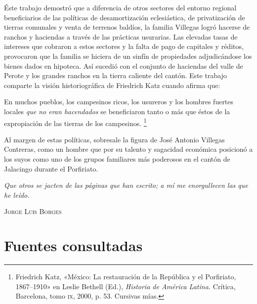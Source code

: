 \documentclass[14pt,twoside,final]{extbook} %
\let\oldfootnote\footnote
\renewcommand\footnote[1]{%
\oldfootnote{\hspace{1mm}#1}}
\begin{document}
Éste trabajo demostró que a diferencia de otros sectores del entorno regional beneficiarios de las políticas de desamortización eclesiástica, de privatización de tierras comunales y venta de terrenos baldíos, la familia Villegas logró hacerse de ranchos y haciendas a través de las prácticas usurarias. Las elevadas tasas de intereses que cobraron a estos sectores y la falta de pago de capitales y réditos, provocaron que la familia se hiciera de un sinfín de propiedades adjudicándose los bienes dados en hipoteca. Así sucedió con el conjunto de haciendas del valle de Perote y los grandes ranchos en la tierra caliente del cantón. Este trabajo comparte la visión historiográfica de Friedrich Katz cuando afirma que:
\begin{quoting}
En muchos pueblos, los campesinos ricos, los usureros y los hombres fuertes locales \emph{que no eran hacendados} se beneficiaron tanto o más que éstos de la expropiación de las tierras de los campesinos.\footnote{Friedrich Katz, «México: La restauración de la República y el Porfiriato, 1867--1910» en Leslie Bethell (Ed.), \emph{Historia de América Latina.} Crítica, Barcelona, tomo \textsc{ix}, 2000, p. 53. Cursivas mías.}
\end{quoting}
Al margen de estas políticas, sobresale la figura de José Antonio Villegas Contreras, como un hombre que por su talento y sagacidad económica posicionó a los suyos como uno de los grupos familiares más poderosos en el cantón de Jalacingo durante el Porfiriato.
\newpage
\pagestyle{empty}
\null\vfill
\newpage
\pagestyle{empty}
\begin{flushright}
\begin{minipage}{7.9cm}
\emph{Que otros se jacten de las páginas que han escrito; a mí me enorgullecen las que he leído.}
\end{minipage}
\end{flushright}
\begin{flushright}
\textsc{Jorge Luis Borges}
\end{flushright}
\chapter*{Fuentes consultadas}
\label{ch:fuentes-consultadas}
\thispagestyle{empty}
\pagestyle{fancy}
\fancyhf{} %
\fancyhead[RO,LE]{\thepage}
\renewcommand{\headrulewidth}{0pt}
\end{document}
